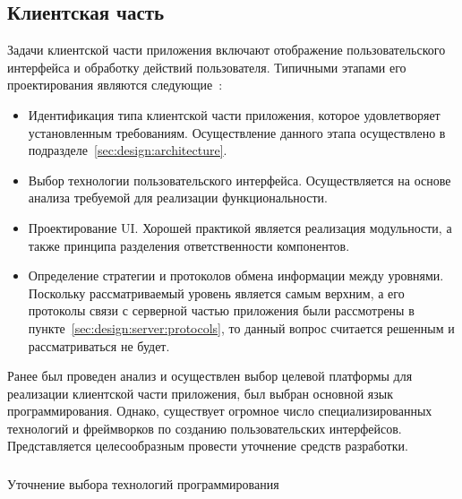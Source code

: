 \subsection{Клиентская часть}
\label{sec:design:client}

Задачи клиентской части приложения включают отображение пользовательского интерфейса и обработку действий пользователя. Типичными этапами его проектирования являются следующие~\cite[с.~78]{applicationArchitectureGuide}:

\begin{itemize}
	\item Идентификация типа клиентской части приложения, которое удовлетворяет установленным требованиям. Осуществление данного этапа осуществлено в подразделе~\ref{sec:design:architecture}.
	\item Выбор технологии пользовательского интерфейса. Осуществляется на основе анализа требуемой для реализации функциональности.
	\item Проектирование UI. Хорошей практикой является реализация модульности, а также принципа разделения ответственности компонентов.
	\item Определение стратегии и протоколов обмена информации между уровнями. Поскольку рассматриваемый уровень является самым верхним, а его протоколы связи с серверной частью приложения были рассмотрены в пункте~\ref{sec:design:server:protocols}, то данный вопрос считается решенным и рассматриваться не будет.
\end{itemize}

Ранее был проведен анализ и осуществлен выбор целевой платформы для реализации клиентской части приложения, был выбран основной язык программирования. Однако, существует огромное число специализированных технологий и фреймворков по созданию пользовательских интерфейсов. Представляется целесообразным провести уточнение средств разработки.

\subsubsection{} Уточнение выбора технологий программирования
\label{sec:design:client:technologies}

